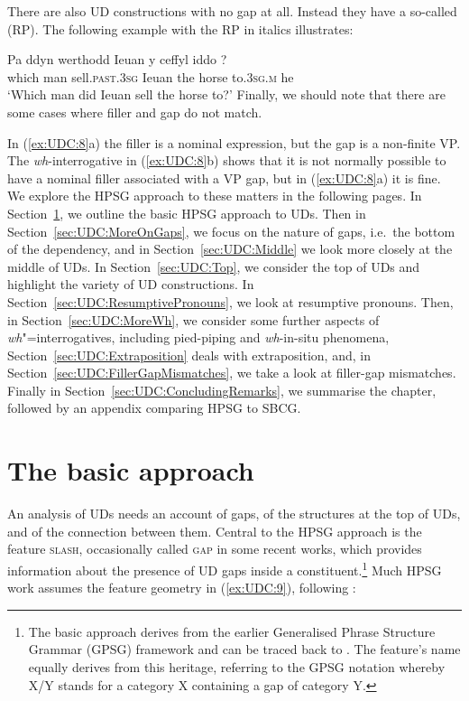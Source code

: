 \documentclass[output=paper
,notxmath 
 	        ,biblatex
                ,babelshorthands
                ,newtxmath
                ,draftmode
                ,colorlinks, citecolor=brown
]{langscibook}
\begin{document}
\noindent 
There are also UD constructions with no gap at all. Instead they
have a so-called  (RP). The following 
example with the RP in italics illustrates:

\ea
\label{ex:UDC:7}
\gll Pa    ddyn werthodd               Ieuan y   ceffyl iddo             ?\\
     which man  sell.\textsc{past.3sg} Ieuan the horse  to\textsc{.3sg.m} he\\
\glt `Which man did Ieuan sell the horse to?'
\z
\noindent
Finally, we should note that there are some cases where filler and gap
do not match.

\eal
\label{ex:UDC:8} 
\zl

\noindent 
In (\ref{ex:UDC:8}a) the filler is a nominal expression, but the
gap is a non-finite VP. The \emph{wh}-interrogative in
(\ref{ex:UDC:8}b) shows that it is not normally possible to have a
nominal filler associated with a VP gap, but in (\ref{ex:UDC:8}a) it
is fine.  We explore the HPSG approach to these matters in the
following pages. In Section~\ref{sec:UDC:BasicApproach}, we outline
the basic HPSG approach to UDs. Then in
Section~\ref{sec:UDC:MoreOnGaps}, we focus on the nature of gaps,
i.e.\ the bottom of the dependency, and in Section~\ref{sec:UDC:Middle}
we look more closely at the middle of UDs. In
Section~\ref{sec:UDC:Top}, we consider the top of UDs and highlight
the variety of UD constructions. In
Section~\ref{sec:UDC:ResumptivePronouns}, we look at resumptive
pronouns. Then, in Section~\ref{sec:UDC:MoreWh}, we consider some
further aspects of \emph{wh}"=interrogatives, including pied-piping
and \emph{wh}-in-situ phenomena, Section~\ref{sec:UDC:Extraposition} deals with extraposition, and, in
Section~\ref{sec:UDC:FillerGapMismatches}, we take a look at
filler-gap mismatches.  Finally in
Section~\ref{sec:UDC:ConcludingRemarks}, we summarise the chapter,
followed by an appendix comparing HPSG to SBCG.  

\section{The basic approach}
\label{sec:UDC:BasicApproach} 

An analysis of UDs needs an
account of gaps, of the structures at the top of UDs, and of the
connection between them. Central to the HPSG approach is the feature
\textsc{slash}, occasionally called \textsc{gap} in some recent works,
which provides information about the presence of UD gaps inside a
constituent.\footnote{The basic approach derives from the earlier
  Generalised Phrase Structure Grammar (GPSG) framework
  \citep*{Gazdar85} and can be traced back to \citet{gazdar_g81}. The
  feature's name equally derives from this heritage, referring to the
  GPSG notation whereby X/Y stands for a category X containing a gap of
  category Y.} 
Much HPSG work assumes the feature geometry {in} (\ref{ex:UDC:9}), following \citet[Chapter~4]{Pollard:Sag:94}:
\end{document}
